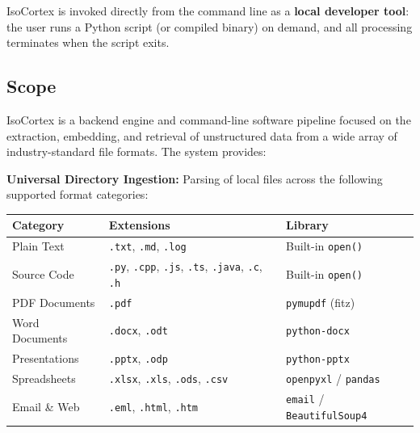 \documentclass[12pt, a4paper]{article}
\begin{document}
IsoCortex is invoked directly from the command line as a \textbf{local
developer tool}: the user runs a Python script (or compiled binary) on
demand, and all processing terminates when the script exits.

\subsection{Scope}

IsoCortex is a backend engine and command-line software pipeline focused on
the extraction, embedding, and retrieval of unstructured data from a wide
array of industry-standard file formats. The system provides:

\begin{prolist}
    \item \textbf{Universal Directory Ingestion:} Parsing of local files
    across the following supported format categories:

    \vspace{0.4cm}
    \begin{tcolorbox}[greenbox, top=6pt, bottom=6pt]
    \small
    \begin{tabular}{@{} p{3.8cm} p{4.5cm} p{5.5cm} @{}}
        \toprule
        \textbf{\textcolor{ctGreen}{Category}}
            & \textbf{\textcolor{ctGreen}{Extensions}}
            & \textbf{\textcolor{ctGreen}{Library}} \\
        \midrule
        Plain Text
            & \texttt{.txt}, \texttt{.md}, \texttt{.log}
            & Built-in \texttt{open()} \\
        \addlinespace
        Source Code
            & \texttt{.py}, \texttt{.cpp}, \texttt{.js}, \texttt{.ts},
              \texttt{.java}, \texttt{.c}, \texttt{.h}
            & Built-in \texttt{open()} \\
        \addlinespace
        PDF Documents
            & \texttt{.pdf}
            & \texttt{pymupdf} (fitz) \\
        \addlinespace
        Word Documents
            & \texttt{.docx}, \texttt{.odt}
            & \texttt{python-docx} \\
        \addlinespace
        Presentations
            & \texttt{.pptx}, \texttt{.odp}
            & \texttt{python-pptx} \\
        \addlinespace
        Spreadsheets
            & \texttt{.xlsx}, \texttt{.xls}, \texttt{.ods}, \texttt{.csv}
            & \texttt{openpyxl} / \texttt{pandas} \\
        \addlinespace
        Email \& Web
            & \texttt{.eml}, \texttt{.html}, \texttt{.htm}
            & \texttt{email} / \texttt{BeautifulSoup4} \\
        \bottomrule
    \end{tabular}
    \end{tcolorbox}


\end{prolist}
\end{document}
